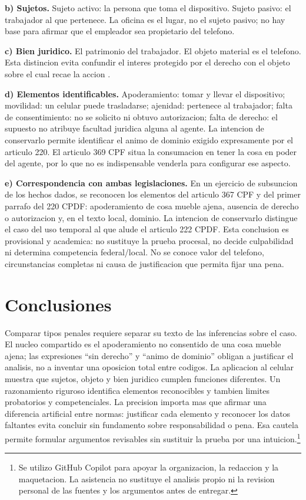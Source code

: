 \documentclass[spanish,letterpaper,oneside]{article}
\begin{document}
\textbf{b) Sujetos.} Sujeto activo: la persona que toma el dispositivo.
Sujeto pasivo: el trabajador al que pertenece. La oficina es el lugar,
no el sujeto pasivo; no hay base para afirmar que el empleador sea
propietario del telefono.

\textbf{c) Bien juridico.} El patrimonio del trabajador. El objeto
material es el telefono. Esta distincion evita confundir el interes
protegido por el derecho con el objeto sobre el cual recae la accion
\citep{unadmPenalS2}.

\textbf{d) Elementos identificables.} Apoderamiento: tomar y llevar el
dispositivo; movilidad: un celular puede trasladarse; ajenidad:
pertenece al trabajador; falta de consentimiento: no se solicito ni
obtuvo autorizacion; falta de derecho: el supuesto no atribuye facultad
juridica alguna al agente. La intencion de conservarlo permite
identificar el animo de dominio exigido expresamente por el articulo
220. El articulo 369 CPF situa la consumacion en tener la cosa en poder
del agente, por lo que no es indispensable venderla para configurar ese
aspecto.

\textbf{e) Correspondencia con ambas legislaciones.} En un ejercicio de
subsuncion de los hechos dados, se reconocen los elementos del articulo
367 CPF y del primer parrafo del 220 CPDF: apoderamiento de cosa mueble
ajena, ausencia de derecho o autorizacion y, en el texto local, dominio.
La intencion de conservarlo distingue el caso del uso temporal al que
alude el articulo 222 CPDF. Esta conclusion es provisional y academica:
no sustituye la prueba procesal, no decide culpabilidad ni determina
competencia federal/local. No se conoce valor del telefono,
circunstancias completas ni causa de justificacion que permita fijar una
pena.

\clearpage
\section{Conclusiones}\label{conclusion}

Comparar tipos penales requiere separar su texto de las inferencias
sobre el caso. El nucleo compartido es el apoderamiento no consentido de
una cosa mueble ajena; las expresiones ``sin derecho'' y ``animo de
dominio'' obligan a justificar el analisis, no a inventar una oposicion
total entre codigos. La aplicacion al celular muestra que sujetos,
objeto y bien juridico cumplen funciones diferentes. Un razonamiento
riguroso identifica elementos reconocibles y tambien limites probatorios
y competenciales.
La precision importa mas que afirmar una diferencia artificial entre
normas: justificar cada elemento y reconocer los datos faltantes evita
concluir sin fundamento sobre responsabilidad o pena. Esa cautela permite formular
argumentos revisables sin sustituir la prueba por una intuicion.\footnote{
Se utilizo GitHub Copilot para apoyar la organizacion, la redaccion y
la maquetacion. La asistencia no sustituye el analisis propio ni la
revision personal de las fuentes y los argumentos antes de entregar.}
\end{document}
